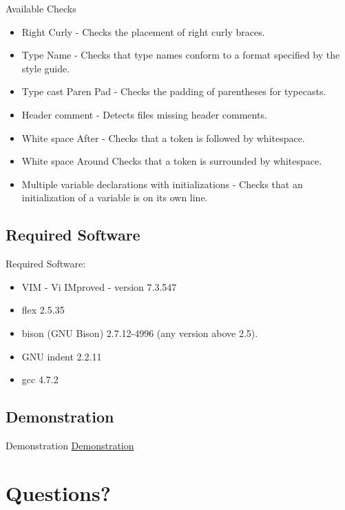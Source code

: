 \documentclass[compress]{beamer}
\begin{document}
\begin{frame}{Available Checks}
\begin{multicols}{2}
{\begin{enumerate}
{{\begin{itemize}
        left parenthesis and before a right parenthesis.
        \item Right Curly - Checks the placement of right curly braces.
        \item Type Name - Checks that type names conform to a format specified by the style guide.
        \item Type cast Paren Pad - Checks the padding of parentheses for typecasts.
        \item Header comment - Detects files missing header comments.
        \item White space After - Checks that a token is followed by whitespace.
        \item White space Around Checks that a token is surrounded by whitespace.
        \item Multiple variable declarations with initializations - Checks that an initialization of a variable is on its own line.
    \end{itemize}}
     }

\end{enumerate}}
\end{multicols}
\end{frame}

\subsection{Required Software}
	\begin{frame}
	Required Software:
		\begin{itemize}
			\item VIM - Vi IMproved - version 7.3.547
			\item flex 2.5.35
			\item bison (GNU Bison) 2.7.12-4996 (any version above 2.5).
			\item GNU indent 2.2.11
			\item gcc 4.7.2
		\end{itemize}
	\end{frame}

\subsection{Demonstration}
\begin{frame}{Demonstration}
\href{http://localhost/uploader.php}{Demonstration}
\end{frame}

\section{Questions?}
\end{document}
